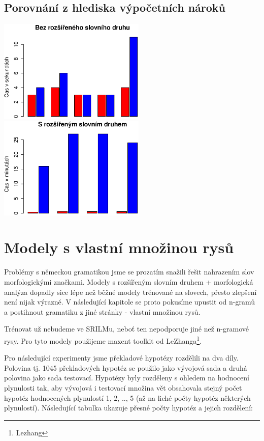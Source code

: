 \documentclass[12pt,a4paper]{report}
\begin{document}
\section{Porovnání z hlediska výpočetních nároků}
\begin{center}
	\includegraphics[width=70mm]{./grafy/morf/cas/rsd/bez.eps}
	\includegraphics[width=70mm]{./grafy/morf/cas/rsd/rsd.eps}
\end{center}

\chapter{Modely s vlastní množinou rysů}
Problémy s německou gramatikou jsme se prozatím snažili řešit nahrazením slov morfologickými značkami. Modely s rozšířeným slovním druhem + morfologická analýza dopadly sice lépe než běžné modely trénované na slovech, přesto zlepšení není nijak výrazné. V následující kapitole se proto pokusíme upustit od n-gramů a postihnout gramatiku z jiné stránky - vlastní množinou rysů.

Trénovat už nebudeme ve SRILMu, neboť ten nepodporuje jiné než n-gramové rysy. Pro tyto modely použijeme maxent toolkit od LeZhanga\footnote{Lezhang}.

Pro následující experimenty jsme překladové hypotézy rozdělili na dva díly. Polovina tj. 1045 překladových hypotéz se použilo jako vývojová sada a druhá polovina jako sada testovací. Hypotézy byly rozděleny s ohledem na hodnocení plynulosti tak, aby vývojová i testovací množina vět obsahovala stejný počet hypotéz hodnocených plynulostí 1, 2, .., 5 (až na liché počty hypotéz některých plynulostí). Následující tabulka ukazuje přesné počty hypotéz a jejich rozdělení:
\end{document}
